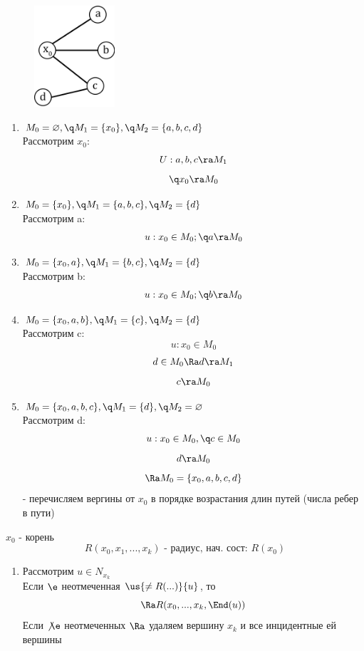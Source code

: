 \documentclass[discrete.tex]{subfiles}
\begin{document}
  \begin{example} \
    \begin{figure}[H]
            \includegraphics[width=3cm]{pics/38_1}
            \centering
    \end{figure}
    \begin{enumerate}
      \item $M_0 = \varnothing,\q M_1 = \{x_0\},\q M_2 = \{a,b,c,d\}$\\
      Рассмотрим $x_0$:
      \[U: a,b,c \ra M_1\]
      \[\q x_0 \ra M_0\]
      \item $M_0 = \{x_0\},\q M_1 = \{a,b,c\},\q M_2 = \{d\}$\\
      Рассмотрим a:
      \[u: x_0 \in M_0;\q a \ra M_0\]
      \item $M_0=\{x_0,a\},\q M_1 = \{b,c\},\q M_2=\{d\}$\\
      Рассмотрим b:
      \[u: x_0 \in M_0;\q b \ra M_0\]
      \item $M_0=\{x_0,a,b\},\q M_1 = \{c\},\q M_2 = \{d\}$\\
      Рассмотрим c:
      \[u: x_0 \in M_0\]
      \[d \in M_0 \Ra d \ra M_1\]
      \[c \ra M_0\]
      \item $M_0=\{x_0,a,b,c\},\q M_1 = \{d\},\q M_2 = \varnothing$\\
      Рассмотрим d:
      \[u: x_0 \in M_0,\q c \in M_0\]
      \[d \ra M_0\]
      \[\Ra M_0=\{x_0,a,b,c,d\}\]
      - перечисляем вергины от $x_0$ в порядке возрастания длин путей (числа ребер в пути)
    \end{enumerate}
  \end{example}

  \begin{alg}
    $x_0$ - корень
    \[R(x_0,x_1,...,x_k) \text{ - радиус, нач. сост: }R(x_0)\]
    \begin{enumerate}
      \item Рассмотрим $u \in N_{x_k}$\\
      Если $\e$ неотмеченная $\us{\neq R(...)}{u}$, то
      \[\Ra R(x_0,...,x_k,\End(u))\]
      Если $\not \e$ неотмеченных $\Ra$ удаляем вершину $x_k$ и все инцидентные ей вершины
    \end{enumerate}
  \end{alg}
\end{document}
